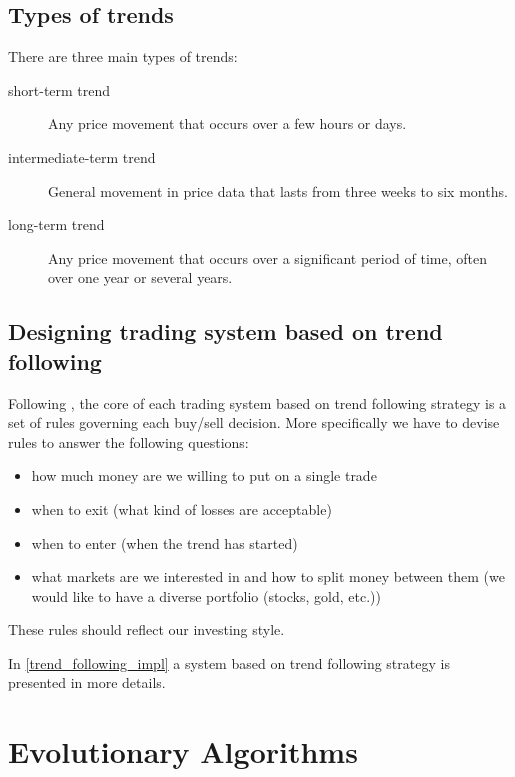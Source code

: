 \subsection{Types of trends}

There are three main types of trends:

\begin{description}
  \item [short-term trend]
      Any price movement that occurs over a few hours or days.
  \item [intermediate-term trend]
      General movement in price data that lasts from three weeks to six months.
  \item [long-term trend]
      Any price movement that occurs over a significant period of time, often over one year or several years.
\end{description}



\subsection{Designing trading system based on trend following} 

Following \cite{Trend01}, the core of each trading system based on trend following strategy is a set of rules governing each buy/sell decision.
More specifically we have to devise rules to answer the following questions:

\begin{itemize}
  \item how much money are we willing to put on a single trade
  \item when to exit (what kind of losses are acceptable)
  \item when to enter (when the trend has started) 
  \item what markets are we interested in and how to split money between them (we would like to have a diverse portfolio (stocks, gold, etc.))
\end{itemize}

These rules should reflect our investing style.

In \ref{trend_following_impl} a system based on trend following strategy is presented in more details.


\section{Evolutionary Algorithms}
\label{sec:evolAlgorithms}


